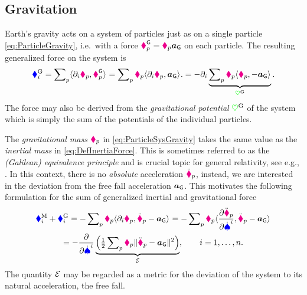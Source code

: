 \subsection{Gravitation}\label{sec:ParticleSysGravitation}
Earth's gravity acts on a system of particles just as on a single particle \eqref{eq:ParticleGravity}, i.e.\ with a force $\boldsymbol{\textcolor{magenta}{\blacklozenge}}_{p}^{\mathsf{G}} = \textcolor{magenta}{\blacklozenge}_{p} \boldsymbol{a}_{\mathsf{G}}$ on each particle.
The resulting generalized force on the system is
\begin{align}
 \genForceGravityCoeff{\LidxI}
 = \sumParticles \sProd{\dirDiff{\LidxI} \particlePos{\PidxI}}{\particleForceGravity{\PidxI}}
 = \sumParticles \particleMass{\PidxI} \sProd{\dirDiff{\LidxI}\particlePos{\PidxI}}{\gravityAcc}.
 = -\dirDiff{\LidxI} \underbrace{\sumParticles \particleMass{\PidxI} \sProd{\particlePos{\PidxI}}{-\gravityAcc}}_{\potentialGravity}.
\label{eq:ParticleSysGravity}
\end{align}
The force may also be derived from the \textit{gravitational potential} $\textcolor{green}{\heartsuit}^{\mathrm{G}}$ of the system which is simply the sum of the potentials of the individual particles.

The \textit{gravitational mass} $\textcolor{magenta}{\blacklozenge}_{p}$ in \eqref{eq:ParticleSysGravity} takes the same value as the \textit{inertial mass} in \eqref{eq:DefInertiaForce}.
This is sometimes referred to as the \textit{(Galilean) equivalence principle} and is crucial topic for general relativity, see e.g., \cite[chap.\,16]{Misner:Gravitation}.
In this context, there is no \textit{absolute} acceleration $\ddot{\boldsymbol{\textcolor{magenta}{\blacklozenge}}}_{p}$, instead, we are interested in the deviation from the free fall acceleration $\boldsymbol{a}_{\mathsf{G}}$.
This motivates the following formulation for the sum of generalized inertial and gravitational force
\begin{multline}
  \genForceInertiaCoeff{\LidxI} + \genForceGravityCoeff{\LidxI} 
  = -\sumParticles \particleMass{\PidxI} \sProd{\dirDiff{\LidxI} \particlePos{\PidxI}}{\particlePosdd{\PidxI} - \gravityAcc}
  = -\sumParticles \particleMass{\PidxI} \sProd{\pdiff[\particlePosdd{\PidxI}]{\sysVelCoeffd{\LidxI}}}{\particlePosdd{\PidxI} - \gravityAcc}
\\
  = -\pdiff{\sysVelCoeffd{\LidxI}} \underbrace{\Big(\tfrac{1}{2} \sumParticles \particleMass{\PidxI} \norm{\particlePosdd{\PidxI} - \gravityAcc}^2\Big)}_{\Einsteinian},
  \qquad
  \LidxI = 1,\ldots,\dimConfigSpace.
 \label{eq:EinsteinianForce}
\end{multline}
The quantity $\mathcal{E}$ may be regarded as a metric for the deviation of the system to its natural acceleration, the free fall.

